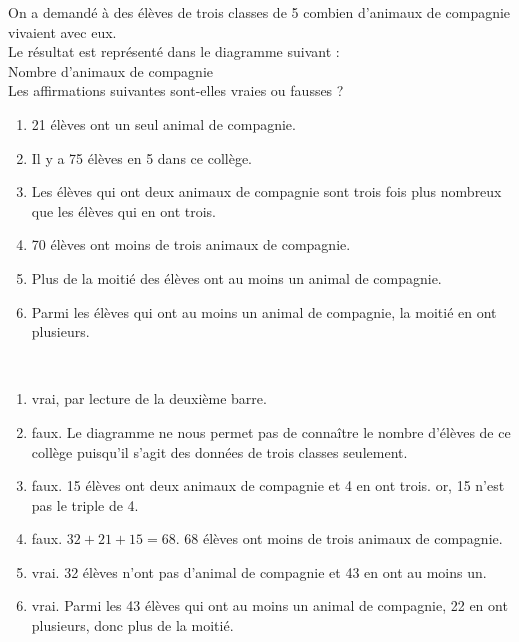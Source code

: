 \exercicesbase

\begin{colonne*exercice}

\begin{exercice} %
   On a demandé à des élèves de trois classes de 5 combien d'animaux de compagnie vivaient avec eux. \\
   Le résultat est représenté dans le diagramme suivant :
    \\ [-8mm]
   \hspace*{27mm} Nombre d'animaux de compagnie \\ [2mm]
   Les affirmations suivantes sont-elles vraies ou fausses ?
   \begin{enumerate}
      \item 21 élèves ont un seul animal de compagnie.
      \item Il y a 75 élèves en 5 dans ce collège.
      \item Les élèves qui ont deux animaux de compagnie sont trois fois plus nombreux que les élèves qui en ont trois.
      \item 70 élèves ont moins de trois animaux de compagnie.
      \item Plus de la moitié des élèves ont au moins un animal de compagnie.
      \item Parmi les élèves qui ont au moins un animal de compagnie, la moitié en ont plusieurs.
   \end{enumerate}
\end{exercice}

\begin{corrige}
\ \\ [-5mm]
   \begin{enumerate}
      \item {\blue vrai}, par lecture de la deuxième barre.
      \item {\blue faux}. Le diagramme ne nous permet pas de connaître le nombre d'élèves de ce collège puisqu'il s'agit des données de trois classes seulement.
      \item {\blue faux}. 15 élèves ont deux animaux de compagnie et  4 en ont trois. or, 15 n'est pas le triple de 4.
      \item {\blue faux}. $32+21+15 =68$. 68 élèves ont moins de trois animaux de compagnie.   
      \item {\blue vrai}. 32 élèves n'ont pas d'animal de compagnie et 43 en ont au moins un.
      \item {\blue vrai}. Parmi les 43 élèves qui ont au moins un animal de compagnie, 22 en ont plusieurs, donc plus de la moitié.
   \end{enumerate}
\end{corrige}


\end{colonne*exercice}
